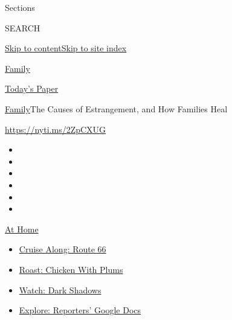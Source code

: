 Sections

SEARCH

\protect\hyperlink{site-content}{Skip to
content}\protect\hyperlink{site-index}{Skip to site index}

\href{https://www.nytimes3xbfgragh.onion/section/well/family}{Family}

\href{https://myaccount.nytimes3xbfgragh.onion/auth/login?response_type=cookie\&client_id=vi}{}

\href{https://www.nytimes3xbfgragh.onion/section/todayspaper}{Today's
Paper}

\href{/section/well/family}{Family}\textbar{}The Causes of Estrangement,
and How Families Heal

\url{https://nyti.ms/2ZpCXUG}

\begin{itemize}
\item
\item
\item
\item
\item
\item
\end{itemize}

\href{https://www.nytimes3xbfgragh.onion/spotlight/at-home?action=click\&pgtype=Article\&state=default\&region=TOP_BANNER\&context=at_home_menu}{At
Home}

\begin{itemize}
\tightlist
\item
  \href{https://www.nytimes3xbfgragh.onion/2020/09/07/travel/route-66.html?action=click\&pgtype=Article\&state=default\&region=TOP_BANNER\&context=at_home_menu}{Cruise
  Along: Route 66}
\item
  \href{https://www.nytimes3xbfgragh.onion/2020/09/04/dining/sheet-pan-chicken.html?action=click\&pgtype=Article\&state=default\&region=TOP_BANNER\&context=at_home_menu}{Roast:
  Chicken With Plums}
\item
  \href{https://www.nytimes3xbfgragh.onion/2020/09/04/arts/television/dark-shadows-stream.html?action=click\&pgtype=Article\&state=default\&region=TOP_BANNER\&context=at_home_menu}{Watch:
  Dark Shadows}
\item
  \href{https://www.nytimes3xbfgragh.onion/interactive/2020/at-home/even-more-reporters-editors-diaries-lists-recommendations.html?action=click\&pgtype=Article\&state=default\&region=TOP_BANNER\&context=at_home_menu}{Explore:
  Reporters' Google Docs}
\end{itemize}

